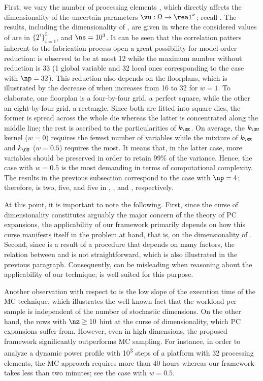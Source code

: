 First, we vary the number of processing elements \np, which directly affects the
dimensionality of the uncertain parameters $\vu: \Omega \to \real^\nu$; recall
. The results, including the dimensionality
\nz of \vz, are given in  where the
considered values of \np are in $\{ 2^i \}_{i = 1}^5$, and $\ns = 10^3$. It can
be seen that the correlation patters inherent to the fabrication process
\cite{cheng2011} open a great possibility for model order reduction: \nz is
observed to be at most 12 while the maximum number without reduction is 33 (1
global variable and 32 local ones corresponding to the case with $\np = 32$).
This reduction also depends on the floorplans, which is illustrated by the
decrease of \nz when \np increases from 16 to 32 for $w = 1$. To elaborate, one
floorplan is a four-by-four grid, a perfect square, while the other an
eight-by-four grid, a rectangle. Since both are fitted into square dies, the
former is spread across the whole die whereas the latter is concentrated along
the middle line; the rest is ascribed to the particularities of $k_\SE$. On
average, the $k_\OU$ kernel ($w = 0$) requires the fewest number of variables
while the mixture of $k_\SE$ and $k_\OU$ ($w = 0.5$) requires the most. It means
that, in the latter case, more variables should be preserved in order to retain
99\% of the variance. Hence, the case with $w = 0.5$ is the most demanding in
terms of computational complexity. The results in the previous subsection
correspond to the case with $\np = 4$; therefore, \nz is two, five, and five in
, , and
, respectively.

At this point, it is important to note the following. First, since the curse of
dimensionality constitutes arguably the major concern of the theory of \ac{PC}
expansions, the applicability of our framework primarily depends on how this
curse manifests itself in the problem at hand, that is, on the dimensionality
\nz of \vz. Second, since \vz is a result of a procedure that depends on many
factors, the relation between \vu and \vz is not straightforward, which is also
illustrated in the previous paragraph. Consequently, \nu can be misleading when
reasoning about the applicability of our technique; \nz is well suited for this
purpose.

Another observation with respect to  is the
low slope of the execution time of the \ac{MC} technique, which illustrates the
well-known fact that the workload per sample is independent of the number of
stochastic dimensions. On the other hand, the rows with $\nz \geq 10$ hint at
the curse of dimensionality, which \ac{PC} expansions suffer from. However, even
in high dimensions, the proposed framework significantly outperforms \ac{MC}
sampling. For instance, in order to analyze a dynamic power profile with
10\textsuperscript{3} steps of a platform with 32 processing elements, the
\ac{MC} approach requires more than 40 hours whereas our framework takes less
than two minutes; see the case with $w = 0.5$.

